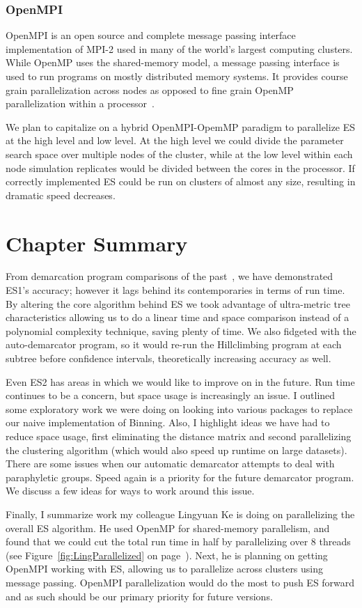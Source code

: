 \subsubsection*{OpenMPI}
OpenMPI is an open source and complete message passing interface implementation of MPI-2 used in many of the world's largest computing clusters.
While OpenMP uses the shared-memory model, a message passing interface is used to run programs on mostly distributed memory systems.
It provides course grain parallelization across nodes as opposed to fine grain OpenMP parallelization within a processor~\cite{gabriel04:_open_mpi}.

We plan to capitalize on a hybrid OpenMPI-OpemMP paradigm to parallelize ES at the high level and low level.
At the high level we could divide the parameter search space over multiple nodes of the cluster, while at the low level within each node simulation replicates would be divided between the cores in the processor.
If correctly implemented ES could be run on clusters of almost any size, resulting in dramatic speed decreases.


\section{Chapter Summary}
From demarcation program comparisons of the past~\cite{carlo}, we have demonstrated ES1's accuracy; however it lags behind its contemporaries in terms of run time.
By altering the core algorithm behind ES we took advantage of ultra-metric tree characteristics allowing us to do a linear time and space comparison instead of a polynomial complexity technique, saving plenty of time.
We also fidgeted with the auto-demarcator program, so it would re-run the Hillclimbing program at each subtree before confidence intervals, theoretically increasing accuracy as well.

Even ES2 has areas in which we would like to improve on in the future.
Run time continues to be a concern, but space usage is increasingly an issue.
I outlined some exploratory work we were doing on looking into various packages to replace our naive implementation of Binning.
Also, I highlight ideas we have had to reduce space usage, first eliminating the distance matrix and second parallelizing the clustering algorithm (which would also speed up runtime on large datasets).
There are some issues when our automatic demarcator attempts to deal with paraphyletic groups.
Speed again is a priority for the future demarcator program.
We discuss a few ideas for ways to work around this issue.

Finally, I summarize work my colleague Lingyuan Ke is doing on parallelizing the overall ES algorithm.
He used OpenMP for shared-memory parallelism, and found that we could cut the total run time in half by parallelizing over 8 threads (see Figure~\ref{fig:LingParallelized} on page~\pageref{fig:LingParallelized}).
Next, he is planning on getting OpenMPI working with ES, allowing us to parallelize across clusters using message passing.
OpenMPI parallelization would do the most to push ES forward and as such should be our primary priority for future versions.

